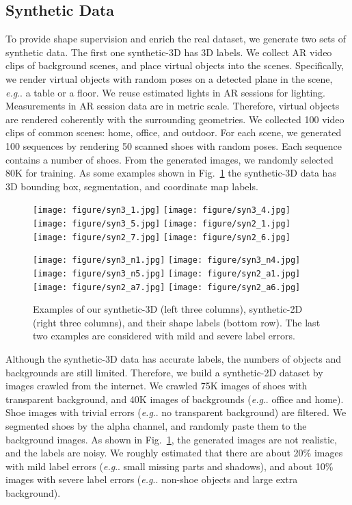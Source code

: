 \documentclass[runningheads]{llncs}
\makeatletter
\DeclareRobustCommand\onedot{\futurelet\@let@token\@onedot}
\def\@onedot{\ifx\@let@token.\else.\null\fi\xspace}
\def\eg{\emph{e.g}\onedot} \def\Eg{\emph{E.g}\onedot}
\makeatother
\begin{document}
\subsection{Synthetic Data}

To provide shape supervision and enrich the real dataset, we generate two sets of synthetic data. The first one synthetic-3D has 3D labels. We collect AR video clips of background scenes, and place virtual objects into the scenes. Specifically, we render virtual objects with random poses on a detected plane in the scene, \eg a table or a floor. We reuse estimated lights in AR sessions for lighting. Measurements in AR session data are in metric scale. Therefore, virtual objects are rendered coherently with the surrounding geometries. We collected 100 video clips of common scenes: home, office, and outdoor. For each scene, we generated 100 sequences by rendering 50 scanned shoes with random poses. Each sequence contains a number of shoes. From the generated images, we randomly selected 80K for training. As some examples shown in Fig.~\ref{fig:syn} the synthetic-3D data has 3D bounding box, segmentation, and coordinate map labels.

\begin{figure}[t]
    \centering
    \texttt{[image: figure/syn3\_1.jpg]}
    \texttt{[image: figure/syn3\_4.jpg]}
    \texttt{[image: figure/syn3\_5.jpg]}
    \texttt{[image: figure/syn2\_1.jpg]}
    \texttt{[image: figure/syn2\_7.jpg]}
    \texttt{[image: figure/syn2\_6.jpg]}
    
    \texttt{[image: figure/syn3\_n1.jpg]}
    \texttt{[image: figure/syn3\_n4.jpg]}
    \texttt{[image: figure/syn3\_n5.jpg]}
    \texttt{[image: figure/syn2\_a1.jpg]}
    \texttt{[image: figure/syn2\_a7.jpg]}
    \texttt{[image: figure/syn2\_a6.jpg]}
    \caption{Examples of our synthetic-3D (left three columns), synthetic-2D (right three columns), and their shape labels (bottom row). The last two examples are considered with mild and severe label errors.}
    \label{fig:syn}
\end{figure}

Although the synthetic-3D data has accurate labels, the numbers of objects and backgrounds are still limited. Therefore, we build a synthetic-2D dataset by images crawled from the internet. We crawled 75K images of shoes with transparent background, and 40K images of backgrounds (\eg office and home). Shoe images with trivial errors (\eg no transparent background) are filtered. We segmented shoes by the alpha channel, and randomly paste them to the background images. As shown in Fig.~\ref{fig:syn}, the generated images are not realistic, and the labels are noisy. We roughly estimated that there are about 20\% images with mild label errors (\eg small missing parts and shadows), and about 10\% images with severe label errors (\eg non-shoe objects and large extra background).
\end{document}
